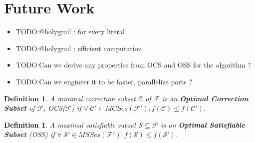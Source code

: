 \documentclass{article}
\newcommand\m[1]{\mathcal{#1}}
\newtheorem{definition}[thm]{Definition}
\newcommand\comment[1]{\marginpar{\tiny #1}}
\renewcommand\comment[1]{#1}
\newcommand{\todo}[1]{{\comment{\color{red}\textsc{TODO:}#1}}}
\begin{document}
\newpage
\section{Future Work}

\begin{itemize}
  \item \todo{@holygrail : for every literal }
  \item \todo{@holygrail : efficient computation}
  \item \todo{Can we derive any properties from OCS and OSS for the algorithm ?}
  \item \todo{Can we engineer it to be faster, parallelize parts ?}
\end{itemize}

\begin{definition}
  A \emph{minimal correction subset} $\m{C}$ of $\m{F}$ is an \textbf{Optimal Correction Subset} of $\m{F}$, OCS($\m{F}$) if $\forall \ \m{C}' \in MCSes(\m{F}'): f(\m{C}) \leq f(\m{C}')$.
\end{definition}

\begin{definition}
  A \emph{maximal satisfiable subset} $\m{S} \subseteq \m{F}$ is an \textbf{Optimal Satisfiable Subset} (OSS) if $\forall \ \m{S}' \in MSSes(\m{F}'): f(\m{S}) \leq f(\m{S}')$.
\end{definition}



\newpage


\end{document}
